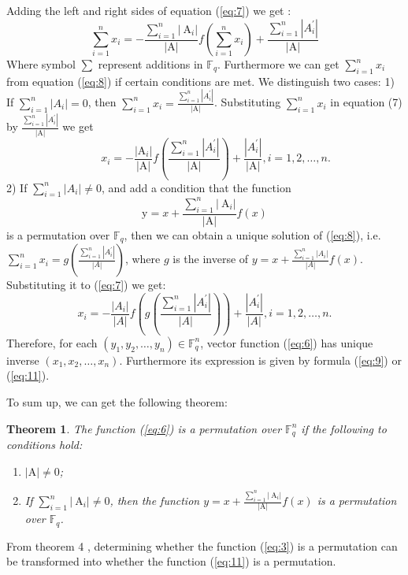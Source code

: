 \documentclass[12pt,a4paper]{article}
\newcommand{\0}{\textbf{0}}
\newcommand{\1}{\textbf{1}}
\newtheorem{theorem}{Theorem}
\begin{document}
    Adding the left and right sides of equation (\ref{eq:7}) we get :
    \begin{equation}\label{eq:8}
        \sum_{i=1}^{n} x_{i}=-\frac{\sum_{i=1}^{n}\left|\mathrm{~A}_{i}\right|}{|\mathrm{A}|} f\left(\sum_{i=1}^{n} x_{i}\right)+\frac{\sum_{i=1}^{n}\left|A_{i}^{\prime}\right|}{|\mathrm{A}|}
    \end{equation}
    Where symbol $\sum$ represent additions in $\mathbb{F}_{{q}}$.
    Furthermore we can get $\sum_{i=1}^{n} x_{i}$ from equation (\ref{eq:8}) if certain conditions are met.
    We distinguish two cases:
    1) If $\sum_{i=1}^{n}\left|A_{i}\right|=0$, then $\sum_{i=1}^{n} x_{i}=\frac{\sum_{i=1}^{n}\left|A_{i}^{\prime}\right|}{|\mathrm{A}|}$. 
    Substituting $\sum_{i=1}^{n} x_{i}$ in equation (7) by $ \frac{\sum_{i=1}^{n}\left|A_{i}^{\prime}\right|}{|\mathrm{A}|} $ we get
    \begin{equation}\label{eq:9}
        \qquad x_{i}=-\frac{\left|\mathrm{A}_{i}\right|}{|\mathrm{A}|} f\left(\frac{\sum_{i=1}^{n}\left|A_{i}^{\prime}\right|}{|\mathrm{A}|}\right)+\frac{\left|A_{i}^{\prime}\right|}{|\mathrm{A}|}, i=1,2, \dots, n .
    \end{equation}
    2) If $\sum_{i=1}^{n}\left|A_{i}\right| \neq 0$, and add a condition that the function
    \begin{equation}\label{eq:10}
        \mathrm{y}=x+\frac{\sum_{i=1}^{n}\left|\mathrm{~A}_{i}\right|}{|\mathrm{A}|} f(x)
    \end{equation}
    is a permutation over $ \mathbb{F}_q $, then we can obtain a unique solution of (\ref{eq:8}), i.e. 
    $ \sum_{i=1}^{n}x_i=g\left(\frac{\sum_{i=1}^{n}|A_i^{\prime}|}{|A|}\right) $, where $ g $ is the inverse of 
    $ y=x+\frac{\sum_{i=1}^{n}|A_i|}{|A|}f(x) $. Substituting it to (\ref{eq:7}) we get:
    \begin{equation}\label{eq:11}
        x_i=-\frac{|A_i|}{|A|}f\left(g\left(\frac{\sum_{i=1}^{n}|A_i^{\prime}|}{|A|}\right)\right)+\frac{|A_i^{\prime}|}{|A|}, i=1,2,\dots,n.
    \end{equation}
    Therefore, for each $(y_1,y_2,\dots,y_n)\in\mathbb{F}_q^n$, vector function (\ref{eq:6}) has unique inverse $(x_1,x_2,\dots,x_n)$. 
    Furthermore its expression is given by formula (\ref{eq:9}) or (\ref{eq:11}).

    To sum up, we can get the following theorem:
    \begin{theorem}
        The function (\ref{eq:6}) is a permutation over $\mathbb{F}_{{q}}^n$ if the following to conditions hold:
        \begin{enumerate}[label=\arabic*)]
            \item $|\mathrm{A}| \neq 0$;
            \item If $\sum_{i=1}^{n}\left|\mathrm{~A}_{i}\right| \neq 0$, then the function ${y}=x+\frac{\sum_{i=1}^{n}\left|\mathrm{~A}_{i}\right|}{|\mathrm{A}|} f(x)$ is a permutation over $\mathbb{F}_{{q}}$.
        \end{enumerate}
    \end{theorem}
    From theorem 4 , determining whether the function (\ref{eq:3}) is a permutation can be transformed into whether the function (\ref{eq:11}) is a permutation.
\end{document}
